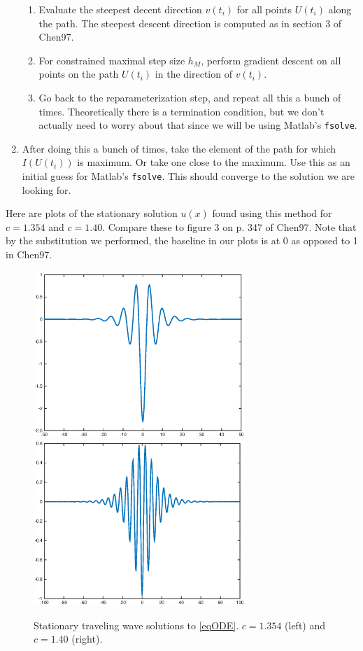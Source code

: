 \documentclass[12pt]{article}
\begin{document}
\begin{enumerate}
\begin{enumerate}
		\item Evaluate the steepest decent direction $v(t_i)$ for all points $U(t_i)$ along the path. The steepest descent direction is computed as in section 3 of Chen97.
		\item For constrained maximal step size $h_M$, perform gradient descent on all points on the path $U(t_i)$ in the direction of $v(t_i)$.
		\item Go back to the reparameterization step, and repeat all this a bunch of times. Theoretically there is a termination condition, but we don't actually need to worry about that since we will be using Matlab's \texttt{fsolve}.
	\end{enumerate}
	\item After doing this a bunch of times, take the element of the path for which $I(U(t_i))$ is maximum. Or take one close to the maximum. Use this as an initial guess for Matlab's \texttt{fsolve}. This should converge to the solution we are looking for.
\end{enumerate}

Here are plots of the stationary solution $u(x)$ found using this method for $c = 1.354$ and $c = 1.40$. Compare these to figure 3 on p. 347 of Chen97. Note that by the substitution we performed, the baseline in our plots is at 0 as opposed to 1 in Chen97.

\begin{figure}[H]
\centering
\includegraphics[width=8cm]{single1354.eps}
\includegraphics[width=8cm]{single14.eps}
\label{fig:single1}
\caption{Stationary traveling wave solutions to \eqref{eqODE}. $c = 1.354$ (left) and $c = 1.40$ (right).}
\end{figure}
\end{document}
